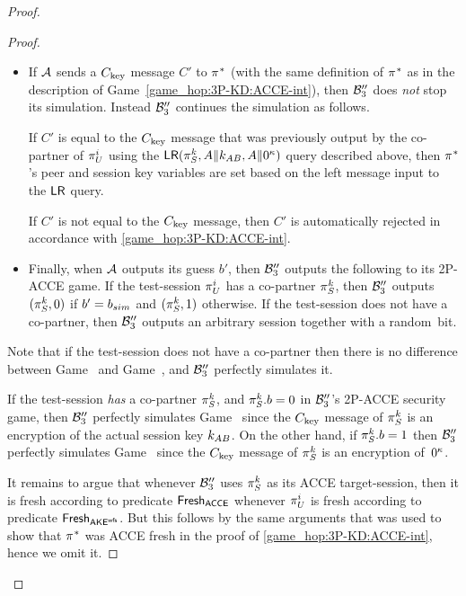 \begin{proof}
\begin{proof}
\begin{itemize}
	\item If $\A$ sends a $\Ckey$ message $C'$ to $\oracle^*$
	(with the same definition of $\oracle^*$ as in the description of Game~\ref{game_hop:3P-KD:ACCE-int}),
	then $\A[B]''_3$ does \emph{not} stop its simulation.
	Instead $\A[B]''_3$ continues the simulation as follows.

	If $C'$ is equal to the $\Ckey$ message that was previously output by the co-partner of $\oracle[U][i]$
	using the $\Encrypt(\oracle[S][k], A \concat \key_{AB}, A \concat 0^{\keylen})$ query described above,
	then $\oracle^*$'s peer and session key variables are set based on the left message input to the $\Encrypt$ query.

	If $C'$ is not equal to the $\Ckey$ message,
	then $C'$ is automatically rejected in accordance with \cref{game_hop:3P-KD:ACCE-int}.
	
	

	\item Finally,
	when $\A$ outputs its guess $b'$,
	then $\A[B]''_3$ outputs the following to its 2P-ACCE game.
	If the test-session $\oracle[U][i]$ has a co-partner $\oracle[S][k]$,
	then $\A[B]''_3$ outputs $(\oracle[S][k],0)$ if $b' = \bsim$ and $(\oracle[S][k], 1)$ otherwise.
	If the test-session does not have a co-partner,
	then $\A[B]''_3$ outputs an arbitrary session together with a random~bit.
\end{itemize}

Note that if the test-session does not have a co-partner then there is no difference between Game~\prevgame{} and Game~\game{},
and $\A[B]''_3$ perfectly simulates it.

If the test-session \emph{has} a co-partner $\oracle[S][k]$,
and $\oracle[S][k].b = 0$ in $\A[B]''_3$'s 2P-ACCE security game,
then $\A[B]''_3$ perfectly simulates Game~\prevgame{}
since the $\Ckey$ message of $\oracle[S][k]$ is an encryption of the actual session key $\key_{AB}$.
On the other hand, if $\oracle[S][k].b = 1$ then $\A[B]''_3$ perfectly simulates Game~\game{}
since the $\Ckey$ message of $\oracle[S][k]$ is an encryption of~$0^{\keylen}$.

It remains to argue that whenever $\A[B]''_3$ uses $\oracle[S][k]$ as its ACCE target-session,
then it is fresh according to predicate $\fresh_{\acce}$ whenever $\oracle[U][i]$ is fresh according to predicate $\fresh_{\akewfs}$.
But this follows by the same arguments that was used to show that $\oracle^*$ was ACCE fresh in the proof of \cref{game_hop:3P-KD:ACCE-int},
hence we omit it.
\end{proof}


\end{proof}
